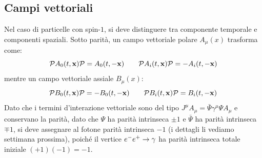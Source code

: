 \subsection{Campi vettoriali}

Nel caso di particelle con spin-$ 1 $, si deve distinguere tra componente temporale e componenti spaziali. Sotto parità, un campo vettoriale polare $ A_\mu(x) $ trasforma come:
\begin{equation*}
  \mathcal{P} A_0(t,\mathbf{x}) \mathcal{P} = A_0(t,-\mathbf{x})
  \qquad
  \mathcal{P} A_i(t,\mathbf{x}) \mathcal{P} = - A_i(t,-\mathbf{x})
\end{equation*}
mentre un campo vettoriale assiale $ B_\mu(x) $:
\begin{equation*}
  \mathcal{P} B_0(t,\mathbf{x}) \mathcal{P} = - B_0(t,-\mathbf{x})
  \qquad
  \mathcal{P} B_i(t,\mathbf{x}) \mathcal{P} = B_i(t,-\mathbf{x})
\end{equation*}
Dato che i termini d'interazione vettoriale sono del tipo $ J^\mu A_\mu = \bar{\Psi} \gamma^\mu \Psi A_\mu $ e conservano la parità, dato che $ \Psi $ ha parità intrinseca $ \pm 1 $ e $ \bar{\Psi} $ ha parità intrinseca $ \mp 1 $, si deve assegnare al fotone parità intrinseca $ -1 $ (i dettagli li vediamo settimana prossima), poiché il vertice $ e^-e^+ \rightarrow \gamma $ ha parità intrinseca totale iniziale $ (+1)(-1) = -1 $.










